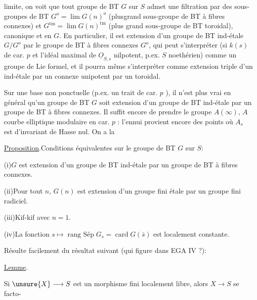 
limite, on voit que tout groupe de BT $G$ sur $S$  admet une filtration par des sous-groupes de BT $G^o=\lim G(n)^o$ (plusgrand sous-groupe de BT à fibres connexes) et $G^{\mathrm{tm}}=\lim G(n)^{\mathrm{tm}}$ (plus grand sous-groupe de BT  toroidal), canonique et  en $G$. En particulier, il est extension d'un groupe de BT ind-étale $G/G^o$ par le groupe de BT à fibres connexes $G^o$, qui peut s'interpréter (si $k(s)$ de car. $p$  et l'idéal maximal de $\underline{O}_{S,s}$ nilpotent, p.ex. $S$ noethérien) comme un groupe de Lie formel, et il pourra même s'interpréter comme extension triple d'un ind-étale par un connexe unipotent par un toroidal.

Sur une base non ponctuelle (p.ex. un trait de car. $p$ ), il n'est plus vrai en général qu'un groupe de BT $G$  soit extension d'un groupe de BT ind-étale par un groupe de BT à fibres connexes. Il suffit encore de prendre le groupe  $A(\infty)$, $A$ courbe elliptique modulaire en car. $p$ : l'ennui provient encore des points où $A_s$ est d'invariant de Hasse nul. On a la

\uline{Proposition}.\quad Conditions équivalentes sur le groupe de BT $G$ sur $S$:

(i)\quad $G$ est extension d'un groupe de BT ind-étale par un groupe de BT à fibres connexes.

(ii)\quad Pour tout $n$, $G(n)$ est extension d'un groupe fini étale par un groupe fini radiciel.

(iii)\quad Kif-kif avec $n=1$.

(iv)\quad La fonction $s\mapsto\operatorname{rang\ Sép}G_s=\operatorname{card}G(\bar{s})$ est localement constante.

Résulte facilement du résultat suivant (qui figure dans EGA IV ?):

\uline{Lemme}.

Si $\unsure{X}\longrightarrow S$ est un morphisme fini localement libre, alors $X\longrightarrow S$ se facto-
